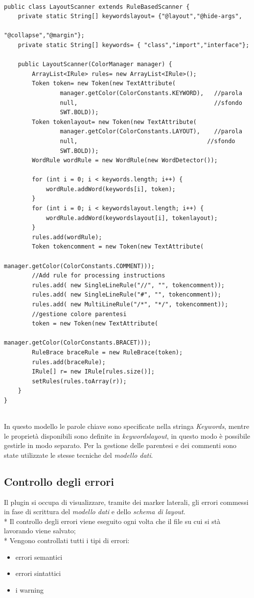 \begin{lstlisting}[caption={LayoutScanner}, style={java}]

public class LayoutScanner extends RuleBasedScanner {
	private static String[] keywordslayout= {"@layout","@hide-args",
												"@collapse","@margin"};
	private static String[] keywords= { "class","import","interface"};
	
	public LayoutScanner(ColorManager manager) {
		ArrayList<IRule> rules= new ArrayList<IRule>();
		Token token= new Token(new TextAttribute(
				manager.getColor(ColorConstants.KEYWORD), 	//parola
				null,                                       //sfondo
				SWT.BOLD));
		Token tokenlayout= new Token(new TextAttribute(
				manager.getColor(ColorConstants.LAYOUT), 	//parola
				null,                                     //sfondo
				SWT.BOLD));
		WordRule wordRule = new WordRule(new WordDetector());

		for (int i = 0; i < keywords.length; i++) {
			wordRule.addWord(keywords[i], token);
		}
		for (int i = 0; i < keywordslayout.length; i++) {
			wordRule.addWord(keywordslayout[i], tokenlayout);
		}
		rules.add(wordRule);
		Token tokencomment = new Token(new TextAttribute(
								manager.getColor(ColorConstants.COMMENT)));
		//Add rule for processing instructions		
		rules.add( new SingleLineRule("//", "", tokencomment));
		rules.add( new SingleLineRule("#", "", tokencomment));
		rules.add( new MultiLineRule("/*", "*/", tokencomment));
        //gestione colore parentesi
		token = new Token(new TextAttribute(
										manager.getColor(ColorConstants.BRACET)));
		RuleBrace braceRule = new RuleBrace(token);
		rules.add(braceRule);
		IRule[] r= new IRule[rules.size()];
		setRules(rules.toArray(r));
	}
}


\end{lstlisting}

In questo modello le parole chiave sono specificate nella
stringa \emph{Keywords}, mentre le proprietà disponibili sono definite in
\emph{keywordslayout}, in questo modo è possibile gestirle in modo separato.
Per la gestione delle parentesi e dei commenti sono state utilizzate le stesse
tecniche del \emph{modello dati}.

\subsection{Controllo degli errori} 
Il plugin si occupa di visualizzare, tramite dei marker laterali, gli errori 
commessi in fase di scrittura del \emph{modello dati} e dello \emph{schema di
layout}. \\*
Il controllo degli errori viene eseguito ogni volta che il file su cui si stà lavorando
viene salvato; \\*
Vengono controllati tutti i tipi di errori:
\begin{itemize}
  \item errori semantici
  \item errori sintattici
  \item i warning
\end{itemize} 

